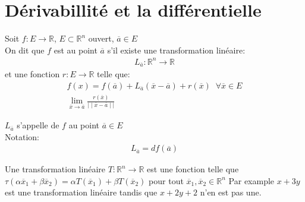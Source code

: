        
           \section{Dérivabillité et la différentielle}
           \begin{definition}
               Soit $f: E \to \mathbb{R}$, $E \subset \mathbb{R}^n $ ouvert, $ \overline{a} \in E$\\
               On dit que $f$ est  au point $ \overline{a}$ s'il existe une transformation linéaire:
               \begin{align*}
                   L_{ \overline{a}}: \mathbb{R}^n  \to \mathbb{R}
               \end{align*}
               et une fonction $ r: E \to \mathbb{R}$ telle que:
               \begin{align*}
                   f(x) = f( \overline{a}) + L_{ \overline{a}}( \overline{x} - \overline{a}) + r ( \overline{x}) \; \; \forall \overline{x} \in E\\
                   \lim_{ \overline{x} \to \overline{a}} \frac{r( \overline{x})}{ \mid \mid \overline{x} - \overline{a} \mid \mid}
               \end{align*}
           \end{definition}
           \begin{definition}
               $L_{ \overline{a}}$ s'appelle  de $f$ au point $ \overline{a} \in E$\\
Notation:
\begin{align*}
    L_{ \overline{a}} = df( \overline{a})
\end{align*}

           \end{definition}
           \begin{framedremark}
               Une transformation linéaire $ T: \mathbb{R}^n  \to \mathbb{R}$ est une fonction telle que $\tau ( \alpha \overline{x}_1 + \beta \overline{x}_2) = \alpha T( \overline{x}_1) + \beta T( \overline{x}_2)$ pour tout $ \overline{x}_1, \overline{x}_2 \in \mathbb{R}^n $
Par example $x + 3y$ est une transformation linéaire tandis que $ x + 2y + 2$ n'en est pas une.
               
           \end{framedremark}
           
           
           
